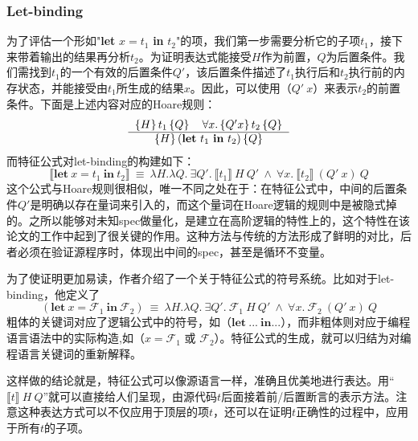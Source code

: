 \documentclass[a4paper,11pt]{article}
\begin{document}
\subsubsection{Let-binding}
为了评估一个形如"\textbf{let}	$x=t_1$ \textbf{in} $t_2$"的项，我们第一步需要分析它的子项$t_1$，接下来带着输出的结果再分析$t_2$。为证明表达式能接受$H$作为前置，$Q$为后置条件。我们需找到$t_1$的一个有效的后置条件$Q'$，该后置条件描述了$t_1$执行后和$t_2$执行前的内存状态，并能接受由$t_1$所生成的结果$x$。因此，可以使用（$Q'~x$）来表示$t_2$的前置条件。下面是上述内容对应的Hoare规则：
	\begin{equation*}
	\begin{tabular}{c}
	$\left \{ H \right \} t_1 \left \{ Q \right \} \quad \forall x. \left \{ Q' x \right \} t_2 \left \{ Q \right \} $
	\\
	\hline
	$\left \{ H \right \} \left (\mathbf{let} ~t_1~\mathbf{in} ~t_2 \right ) \left \{ Q \right \}$
	\end{tabular}
	\end{equation*}
而特征公式对let-binding的构建如下：
\begin{equation*}
\llbracket \mathbf{let} ~x=t_1~\mathbf{in} ~t_2 \rrbracket~\equiv~\lambda H.\lambda Q.~\exists Q'.~\llbracket t_1 \rrbracket~H~Q'~\wedge~\forall x.~ \llbracket t_2 \rrbracket~(Q'~x )~Q  
\end{equation*}
这个公式与Hoare规则很相似，唯一不同之处在于：在特征公式中，中间的后置条件$Q'$是明确以存在量词来引入的，而这个量词在Hoare逻辑的规则中是被隐式掉的。之所以能够对未知spec做量化，是建立在高阶逻辑的特性上的，这个特性在该论文的工作中起到了很关键的作用。这种方法与传统的方法形成了鲜明的对比，后者必须在验证源程序时，体现出中间的spec，甚至是循环不变量。

为了使证明更加易读，作者介绍了一个关于特征公式的符号系统。比如对于let-binding，他定义了
\begin{equation*}
( \mathbf{let} ~x=\mathcal{F}_1~\mathbf{in} ~\mathcal{F}_2 ) ~\equiv~\lambda H.\lambda Q.~\exists Q'.~\mathcal{F}_1~H~Q'~\wedge~\forall x. ~\mathcal{F}_2~(Q'~x)~Q  
\end{equation*}
粗体的关键词对应了逻辑公式中的符号，如（$\mathbf{let} ~...~\mathbf{in}...$），而非粗体则对应于编程语言语法中的实际构造,如（$x=\mathcal{F}_1$ 或 $\mathcal{F}_2 $）。特征公式的生成，就可以归结为对编程语言关键词的重新解释。

这样做的结论就是，特征公式可以像源语言一样，准确且优美地进行表达。用“$\llbracket t \rrbracket~H~Q$”就可以直接给人们呈现，由源代码$t$后面接着前/后置断言的表示方法。注意这种表达方式可以不仅应用于顶层的项$t$，还可以在证明$t$正确性的过程中，应用于所有$t$的子项。
\end{document}
